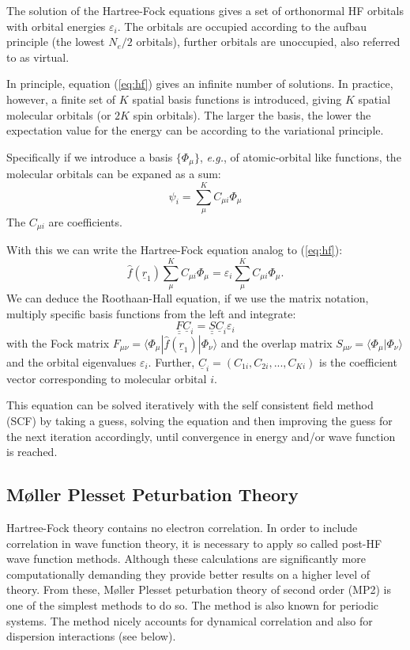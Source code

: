 \documentclass[11pt,DIV=13,BCOR=5mm,a4paper,headinclude]{scrbook}
\renewcommand{\vec}[1]{\underline{#1}}
\def\doubleunderline#1{\underline{\underline{#1}}}
\begin{document}
The solution of the Hartree-Fock equations gives a set of orthonormal HF orbitals with orbital energies $\varepsilon_i$.
The orbitals are occupied according to the aufbau principle (the lowest $N_e/2$ orbitals), further orbitals are unoccupied, also referred to as virtual. 

In principle, equation (\ref{eq:hf}) gives an infinite number of solutions.
In practice, however, a finite set of $K$ spatial basis functions is introduced, giving $K$ spatial molecular orbitals (or $2K$ spin orbitals).
The larger the basis, the lower the expectation value for the energy can be according to the variational principle.

Specifically if we introduce a basis $\{\Phi_\mu\}$, \textit{e.g.}, of atomic-orbital like functions, the molecular orbitals can be expaned as a sum:
\begin{equation}\label{eq:basis}
\psi_i=\sum_\mu^KC_{\mu i}\Phi_\mu
\end{equation}
The $C_{\mu i}$ are coefficients.

With this we can write the Hartree-Fock equation analog to (\ref{eq:hf}):
\begin{equation}
 \hat{f}(\vec{r}_1) \sum_\mu^KC_{\mu i}\Phi_\mu = \varepsilon_i \sum_\mu^KC_{\mu i}\Phi_\mu.
\end{equation}
We can deduce the Roothaan-Hall equation, if we use the matrix notation, multiply specific basis functions from the left and integrate:
\begin{equation}\label{eq:RH}
 \doubleunderline{F} \vec{C}_i=\doubleunderline{S} \vec{C}_i\varepsilon_i
\end{equation}
with the Fock matrix $F_{\mu\nu}=\langle \Phi_\mu|\hat{f}(\vec{r}_1)|\Phi_\nu\rangle$ and the overlap matrix $S_{\mu\nu}=\langle \Phi_\mu|\Phi_\nu\rangle$ and the orbital eigenvalues $\varepsilon_i$.
Further, $\vec{C}_i=(C_{1i}, C_{2i},...,C_{Ki})$ is the coefficient vector corresponding to molecular orbital $i$.

This equation can be solved iteratively with the self consistent field method (SCF) by taking a guess, solving the equation and then improving the guess for the next iteration accordingly, until convergence in energy and/or wave function is reached.


\subsection{M\o{}ller Plesset Peturbation Theory}
Hartree-Fock theory contains no electron correlation.
In order to include correlation in wave function theory, it is necessary to apply so called post-HF wave function methods.
Although these calculations are significantly more computationally demanding they provide better results on a higher level of theory.
From these, M\o{}ller Plesset peturbation theory of second order (MP2)\cite{mollerplesset} is one of the simplest methods to do so.
The method is also known for periodic systems\cite{Suhai1984}.
The method nicely accounts for dynamical correlation and also for dispersion interactions (see below).
\end{document}
